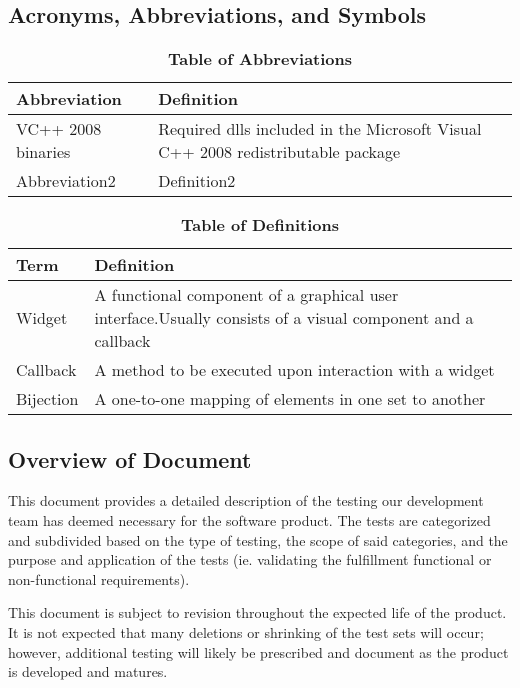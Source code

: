 \documentclass[12pt, titlepage]{article}
\begin{document}
	\subsection{Acronyms, Abbreviations, and Symbols}
	
	\begin{table}[hbp]
		\caption{\textbf{Table of Abbreviations}} \label{AbbrTable}
		\begin{tabularx}{\textwidth}{p{3cm}X}
			\toprule
			\textbf{Abbreviation} & \textbf{Definition} \\
			\midrule
			VC++ 2008 \newline binaries & Required dlls included in the \newline
			Microsoft Visual C++ 2008 redistributable package\\
			Abbreviation2 & Definition2\\
			\bottomrule
		\end{tabularx}
	\end{table}
	\begin{table}[!htbp]
		\caption{\textbf{Table of Definitions}} \label{DefTable}
		\begin{tabularx}{\textwidth}{p{3cm}X}
			\toprule
			\textbf{Term} & \textbf{Definition}\\
			\midrule
			Widget & A functional component of a graphical user interface.\newline Usually
			consists of a visual component and a callback\\
			Callback & A method to be executed upon interaction with a widget\\
			Bijection & A one-to-one mapping of elements in one set to another\\
			\bottomrule
		\end{tabularx}
	\end{table}	
	\subsection{Overview of Document}
	\indent \indent This document provides a detailed description of the 
	testing our development team has deemed necessary for the software product. 
	The tests are categorized and subdivided based on the type of testing, the 
	scope of said categories, and the purpose and application of the tests (ie. 
	validating the fulfillment functional or non-functional requirements).\par
	This document is subject to revision throughout the expected life of the 
	product. It is not expected that many deletions or shrinking of the test 
	sets will occur; however, additional testing will likely be prescribed and 
	document as the product is developed and matures.
	
\end{document}
